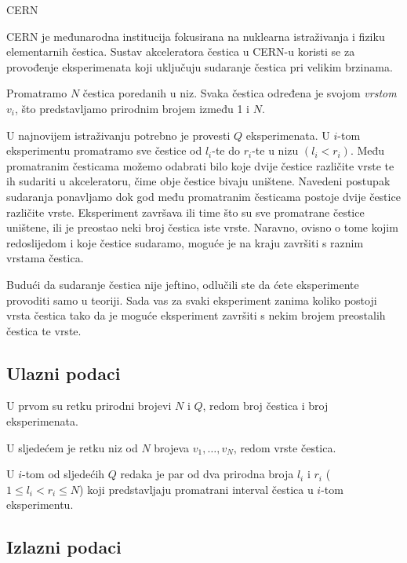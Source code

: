 \begin{statement}[
  problempoints=100,
  timelimit=4 sekunde,
  memorylimit=512 MiB,
]{CERN}

CERN je međunarodna institucija fokusirana na nuklearna istraživanja i fiziku elementarnih čestica. 
Sustav akceleratora čestica u CERN-u koristi se za provođenje eksperimenata koji uključuju sudaranje čestica pri velikim brzinama. 

Promatramo $N$ čestica poredanih u niz. Svaka čestica određena je svojom \textit{vrstom} $v_i$, što 
predstavljamo prirodnim brojem između 1 i $N$. 

U najnovijem istraživanju potrebno je provesti $Q$ eksperimenata. U $i$-tom eksperimentu 
promatramo sve čestice od $l_i$-te do $r_i$-te u nizu $(l_i < r_i)$. Među promatranim česticama 
možemo odabrati bilo koje dvije čestice različite vrste te ih sudariti u akceleratoru, čime obje 
čestice bivaju uništene. Navedeni postupak sudaranja ponavljamo dok god među promatranim česticama 
postoje dvije čestice različite vrste. Eksperiment završava ili time što su sve promatrane čestice 
uništene, ili je preostao neki broj čestica iste vrste. Naravno, ovisno o tome kojim redoslijedom i 
koje čestice sudaramo, moguće je na kraju završiti s raznim vrstama čestica. 

Budući da sudaranje čestica nije jeftino, 
odlučili ste da ćete eksperimente provoditi samo u teoriji. Sada vas za svaki eksperiment zanima 
koliko postoji vrsta čestica tako da je moguće eksperiment završiti s nekim brojem preostalih 
čestica te vrste. 

\subsection*{Ulazni podaci}

U prvom su retku prirodni brojevi $N$ i $Q$, redom broj čestica i broj eksperimenata.

U sljedećem je retku niz od $N$ brojeva $v_1, \dots, v_N$, redom vrste čestica. 

U $i$-tom od sljedećih $Q$ redaka je par od dva prirodna broja $l_i$ i $r_i$ 
($1 \leq l_i < r_i \leq N$) koji predstavljaju promatrani interval čestica u $i$-tom eksperimentu.  

\subsection*{Izlazni podaci}


\end{statement}
